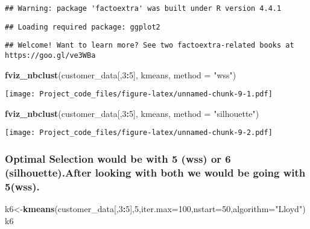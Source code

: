 \documentclass[
]{article}
\newenvironment{Shaded}{\begin{snugshade}}{\end{snugshade}}
\newcommand{\AttributeTok}[1]{\textcolor[rgb]{0.13,0.29,0.53}{#1}}
\newcommand{\DecValTok}[1]{\textcolor[rgb]{0.00,0.00,0.81}{#1}}
\newcommand{\FunctionTok}[1]{\textcolor[rgb]{0.13,0.29,0.53}{\textbf{#1}}}
\newcommand{\NormalTok}[1]{#1}
\newcommand{\OtherTok}[1]{\textcolor[rgb]{0.56,0.35,0.01}{#1}}
\newcommand{\SpecialCharTok}[1]{\textcolor[rgb]{0.81,0.36,0.00}{\textbf{#1}}}
\newcommand{\StringTok}[1]{\textcolor[rgb]{0.31,0.60,0.02}{#1}}
\begin{document}
\begin{verbatim}
## Warning: package 'factoextra' was built under R version 4.4.1
\end{verbatim}

\begin{verbatim}
## Loading required package: ggplot2
\end{verbatim}

\begin{verbatim}
## Welcome! Want to learn more? See two factoextra-related books at https://goo.gl/ve3WBa
\end{verbatim}

\begin{Shaded}
\begin{Highlighting}[]
\FunctionTok{fviz\_nbclust}\NormalTok{(customer\_data[,}\DecValTok{3}\SpecialCharTok{:}\DecValTok{5}\NormalTok{], kmeans, }\AttributeTok{method =} \StringTok{"wss"}\NormalTok{)}
\end{Highlighting}
\end{Shaded}

\texttt{[image: Project\_code\_files/figure-latex/unnamed-chunk-9-1.pdf]}

\begin{Shaded}
\begin{Highlighting}[]
\FunctionTok{fviz\_nbclust}\NormalTok{(customer\_data[,}\DecValTok{3}\SpecialCharTok{:}\DecValTok{5}\NormalTok{], kmeans, }\AttributeTok{method =} \StringTok{"silhouette"}\NormalTok{)}
\end{Highlighting}
\end{Shaded}

\texttt{[image: Project\_code\_files/figure-latex/unnamed-chunk-9-2.pdf]}

\subsubsection{Optimal Selection would be with 5 (wss) or 6
(silhouette).After looking with both we would be going with
5(wss).}\label{optimal-selection-would-be-with-5-wss-or-6-silhouette.after-looking-with-both-we-would-be-going-with-5wss.}

\begin{Shaded}
\begin{Highlighting}[]
\NormalTok{k6}\OtherTok{\textless{}{-}}\FunctionTok{kmeans}\NormalTok{(customer\_data[,}\DecValTok{3}\SpecialCharTok{:}\DecValTok{5}\NormalTok{],}\DecValTok{5}\NormalTok{,}\AttributeTok{iter.max=}\DecValTok{100}\NormalTok{,}\AttributeTok{nstart=}\DecValTok{50}\NormalTok{,}\AttributeTok{algorithm=}\StringTok{"Lloyd"}\NormalTok{)}
\NormalTok{k6}
\end{Highlighting}
\end{Shaded}
\end{document}
